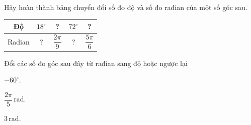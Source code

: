 \begin{bt}%
	Hãy hoàn thành bảng chuyển đổi số đo độ và số đo rađian của một số góc sau.
	\begin{center}
		\begin{longtable}{|c|c|c|c|c|}
			\hline
			Độ & $18^\circ$ & ? & $72^\circ$ & ? \\
			\hline
			Radian & ? & $\dfrac{2\pi}{9}$ & ? & $\dfrac{5\pi}{6}$\\
			\hline
		\end{longtable}
	\end{center}
\end{bt}

\begin{bt}%
	Đổi các số đo góc sau đây từ rađian sang độ hoặc ngược lại
	\begin{listEX}[3]
		\item $-60^{\circ}$.
		\item $\dfrac{2 \pi}{5}\, \mathrm{rad}$.
		\item $3\, \mathrm{rad}$.
	\end{listEX}
\end{bt}

